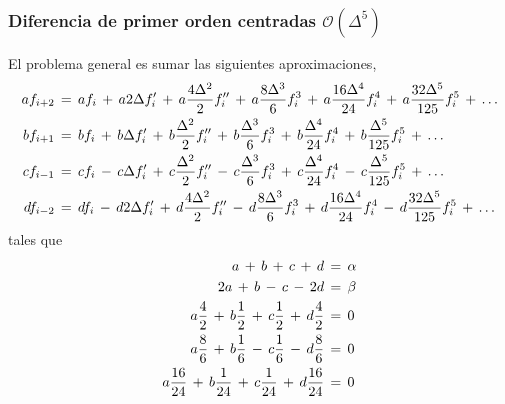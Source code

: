 \documentclass[9pt,technote,twoside,letterpaper,onecolumn]{IEEEtran}
\begin{document}
\begin{multicols}{2}
\subsubsection{Diferencia de primer orden centradas $\mathcal{O}(\Delta^5)$}
\label{sec:dif1D2Od}
El problema general es sumar las siguientes aproximaciones,
{\tiny
  \begin{align}
    af_{i+2}&\,=\,af_i
              \,+\,a2\Delta f'_i
              \,+\,a\frac{4\Delta^2}{2}f''_i
              \,+\,a\frac{8\Delta^3}{6}f^3_i
              \,+\,a\frac{16\Delta^4}{24}f^4_i
              \,+\,a\frac{32\Delta^5}{125}f^5_i  
              \,+\,\ldots  
              \notag\\
    bf_{i+1}&\,=\,bf_i
              \,+\,b\Delta f'_i
              \,+\,b\frac{\Delta^2}{2}f''_i
              \,+\,b\frac{\Delta^3}{6}f^3_i
              \,+\,b\frac{\Delta^4}{24}f^4_i
              \,+\,b\frac{\Delta^5}{125}f^5_i  
              \,+\,\ldots  
              \notag\\
    cf_{i-1}&\,=\,cf_i
               \,-\,c\Delta f'_i
               \,+\,c\frac{\Delta^2}{2}f''_i
               \,-\,c\frac{\Delta^3}{6}f^3_i
               \,+\,c\frac{\Delta^4}{24}f^4_i
               \,-\,c\frac{\Delta^5}{125}f^5_i  
               \,+\,\ldots  
               \notag\\
    df_{i-2}&\,=\,df_i
             \,-\,d2\Delta f'_i
             \,+\,d\frac{4\Delta^2}{2}f''_i
             \,-\,d\frac{8\Delta^3}{6}f^3_i
             \,+\,d\frac{16\Delta^4}{24}f^4_i
             \,-\,d\frac{32\Delta^5}{125}f^5_i  
             \,+\,\ldots
             \notag
  \end{align}
}
tales que
{%
  \begin{align}
    a
    \,+\,b
    \,+\,c
    \,+\,d
    &\,=\,\alpha \notag\\
    2a
    \,+\, b
    \,-\, c
    \,-\,2d
    &\,=\,\beta \notag\\
    a\frac{4}{2}
    \,+\,b\frac{1}{2}
    \,+\,c\frac{1}{2}
    \,+\,d\frac{4}{2}
                         &\,=\,0 \notag\\
    a\frac{8}{6}
    \,+\,b\frac{1}{6}
    \,-\,c\frac{1}{6}
    \,-\,d\frac{8}{6}
                         &\,=\,0 \notag\\  
    a\frac{16}{24}
    \,+\,b\frac{1}{24}
    \,+\,c\frac{1}{24}
    \,+\,d\frac{16}{24}
                         &\,=\,0 \notag
  \end{align}
}
\end{multicols}
\end{document}

